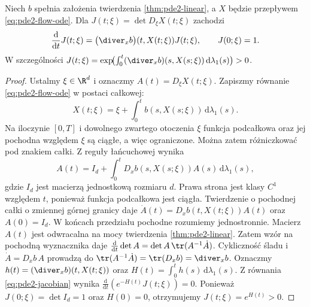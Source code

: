 \begin{stwierdzenie}
\label{prop:pde2-liouville}
Niech $b$ spełnia założenia twierdzenia
\ref{thm:pde2-linear}, a $X$ będzie przepływem
\eqref{eq:pde2-flow-ode}. Dla $J(t;\xi)=\det D_\xi X(t;\xi)$
zachodzi
\begin{equation}\label{eq:pde2-jacobian}
 \frac{\mathrm d}{\mathrm dt}J(t;\xi)
 =\bigl(\diver_x b\bigr)(t,X(t;\xi))J(t;\xi),
 \qquad J(0;\xi)=1.
\end{equation}
W szczególności
$J(t;\xi)=\exp\!\bigl(\int_0^t
(\diver_x b)(s,X(s;\xi))\,\mathrm d\lambda_1(s)\bigr)>0$.
\end{stwierdzenie}
\begin{proof}
Ustalmy $\xi\in\R^d$ i oznaczmy
$A(t)=D_\xi X(t;\xi)$. Zapiszmy równanie
\eqref{eq:pde2-flow-ode} w postaci całkowej:
\[
 X(t;\xi)=\xi+\int_0^t b(s,X(s;\xi))\,\mathrm d\lambda_1(s).
\]
Na iloczynie $[0,T]$ i dowolnego zwartego otoczenia $\xi$
funkcja podcałkowa oraz jej pochodna względem $\xi$
są ciągłe, a więc ograniczone. Można zatem różniczkować
pod znakiem całki. Z reguły łańcuchowej wynika
\[
 A(t)=I_d+\int_0^t D_xb(s,X(s;\xi))A(s)\,\mathrm d\lambda_1(s),
\]
gdzie $I_d$ jest macierzą jednostkową rozmiaru $d$.
Prawa strona jest klasy $C^1$ względem $t$, ponieważ
funkcja podcałkowa jest ciągła. Twierdzenie o pochodnej
całki o zmiennej górnej granicy daje
$\dot A(t)=D_xb(t,X(t;\xi))A(t)$ oraz $A(0)=I_d$.
W końcach przedziału pochodne rozumiemy jednostronnie.
Macierz $A(t)$ jest odwracalna na mocy twierdzenia
\ref{thm:pde2-linear}. Zatem wzór na pochodną wyznacznika
daje $\frac{\mathrm d}{\mathrm dt}\det A
=\det A\,\tr(A^{-1}\dot A)$.
Cykliczność śladu i $\dot A=D_xb\,A$ prowadzą do
$\tr(A^{-1}\dot A)=\tr(D_xb)=\diver_xb$.
Oznaczmy $h(t)=(\diver_xb)(t,X(t;\xi))$ oraz
$H(t)=\int_0^t h(s)\,\mathrm d\lambda_1(s)$.
Z równania \eqref{eq:pde2-jacobian} wynika
$\frac{\mathrm d}{\mathrm dt}(e^{-H(t)}J(t;\xi))=0$.
Ponieważ $J(0;\xi)=\det I_d=1$ oraz $H(0)=0$,
otrzymujemy $J(t;\xi)=e^{H(t)}>0$.
\end{proof}

